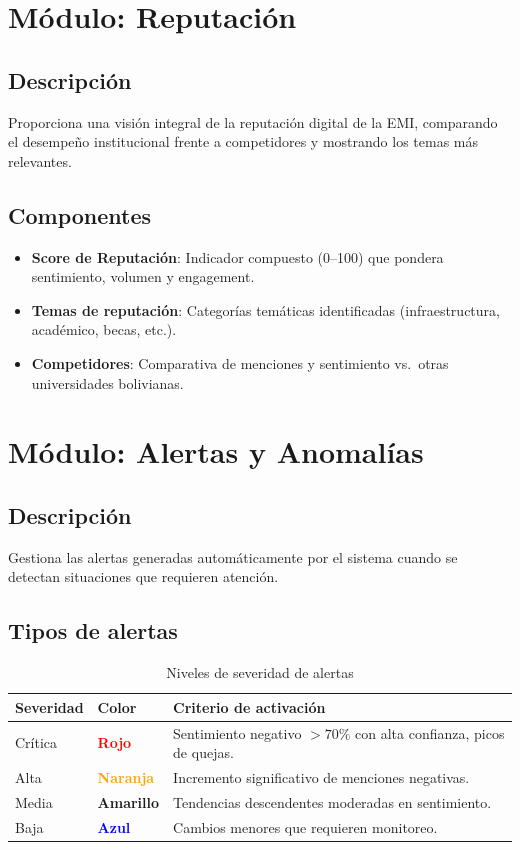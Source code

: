 \documentclass[12pt,a4paper]{article}
\begin{document}
\section{Módulo: Reputación}

\subsection{Descripción}
Proporciona una visión integral de la reputación digital de la EMI, comparando el desempeño institucional frente a competidores y mostrando los temas más relevantes.

\subsection{Componentes}
\begin{itemize}
  \item \textbf{Score de Reputación}: Indicador compuesto (0--100) que pondera sentimiento, volumen y engagement.
  \item \textbf{Temas de reputación}: Categorías temáticas identificadas (infraestructura, académico, becas, etc.).
  \item \textbf{Competidores}: Comparativa de menciones y sentimiento vs.\ otras universidades bolivianas.
\end{itemize}

\section{Módulo: Alertas y Anomalías}

\subsection{Descripción}
Gestiona las alertas generadas automáticamente por el sistema cuando se detectan situaciones que requieren atención.

\subsection{Tipos de alertas}
\begin{table}[H]
\centering
\begin{tabularx}{\textwidth}{l l X}
\toprule
\textbf{Severidad} & \textbf{Color} & \textbf{Criterio de activación} \\
\midrule
Crítica & \textcolor{red}{\textbf{Rojo}} & Sentimiento negativo $>70\%$ con alta confianza, picos de quejas. \\
Alta & \textcolor{orange}{\textbf{Naranja}} & Incremento significativo de menciones negativas. \\
Media & \textcolor{yellow!80!black}{\textbf{Amarillo}} & Tendencias descendentes moderadas en sentimiento. \\
Baja & \textcolor{blue}{\textbf{Azul}} & Cambios menores que requieren monitoreo. \\
\bottomrule
\end{tabularx}
\caption{Niveles de severidad de alertas}
\end{table}
\end{document}
